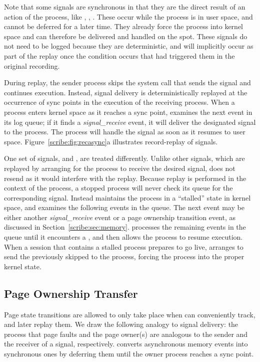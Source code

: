 Note that some signals are synchronous in that they are the direct
result of an action of the process, like ,
, .  These occur while the process is in
user space, and cannot be deferred for a later time.  They already
force the process into kernel space and can therefore be delivered and
handled on the spot.  These signals do not need to be logged because
they are deterministic, and will implicitly occur as part of the
replay once the condition occurs that had triggered them in the
original recording.

During replay, the sender process skips the system call that
sends the signal and continues execution. Instead, signal
delivery is deterministically replayed at the occurrence of sync
points in the execution of the receiving process. When
a process enters kernel space as it reaches a sync point, \scribe{}
examines the next event in its log queue; if it finds a
{\em signal\_receive} event, it will
deliver the designated signal to the process. The process will
handle the signal as soon as it resumes to user space.
Figure~\ref{scribe:fig:recasync}a illustrates record-replay of signals.

One set of signals,  and , are treated
differently.  Unlike other signals, which are replayed by arranging
for the process to receive the desired signal, \scribe{} does not
resend  as it would interfere with the replay. Because
replay is performed in the context of the process, a stopped process
will never check its queue for the corresponding
 signal. Instead \scribe{} maintains the process in a
``stalled'' state in kernel space, and examines the following events in
the queue. The next event may be either another {\em signal\_receive}
event or a page ownership transition event, as discussed in
Section~\ref{scribe:sec:memory}. \scribe{} 
processes the remaining events in the queue
until it encounters a , and then allows the process to
resume execution.  When a session that contains a stalled process
prepares to go live, \scribe{} arranges to send the previously
skipped  to the process, forcing the process into the
proper kernel state.

  

\subsection{Page Ownership Transfer}

Page state transitions are allowed to only take place when \scribe{}
can conveniently track, and later replay them. We draw the following
analogy to signal delivery: the process that page faults and the page
owner(s) are analogous to the sender and the receiver of a signal,
respectively.  \scribe{} converts asynchronous memory events into
synchronous ones by deferring them until the owner process reaches a
sync point.

